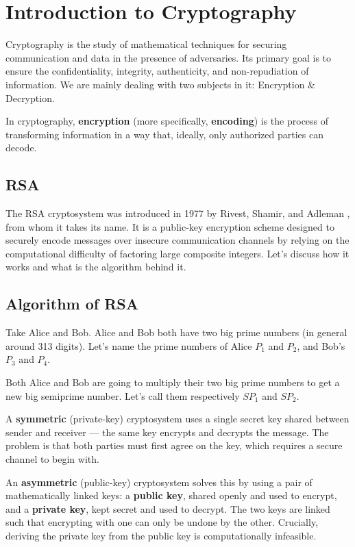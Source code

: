 \section{Introduction to Cryptography}

Cryptography is the study of mathematical techniques for securing communication
and data in the presence of adversaries. Its primary goal is to ensure the
confidentiality, integrity, authenticity, and non-repudiation of information.
We are mainly dealing with two subjects in it: Encryption \& Decryption.

\begin{smjdefinition}
In cryptography, \textbf{encryption} (more specifically, \textbf{encoding})
is the process of transforming information in a way that, ideally, only
authorized parties can decode.
\end{smjdefinition}

\subsection{RSA}

The RSA cryptosystem was introduced in 1977 by Rivest, Shamir, and Adleman
\cite{rsa1978}, from whom it takes its name. It is a public-key encryption
scheme designed to securely encode messages over insecure communication
channels by relying on the computational difficulty of factoring large
composite integers. Let's discuss how it works and what is the algorithm
behind it.

\subsection{Algorithm of RSA}

Take Alice and Bob. Alice and Bob both have two big prime numbers (in general
around 313 digits). Let's name the prime numbers of Alice $P_1$ and $P_2$,
and Bob's $P_3$ and $P_4$.

Both Alice and Bob are going to multiply their two big prime numbers to get a
new big semiprime number. Let's call them respectively $SP_1$ and $SP_2$.

\begin{smjdefinition}
A \textbf{symmetric} (private-key) cryptosystem uses a single secret key
shared between sender and receiver --- the same key encrypts and decrypts the
message. The problem is that both parties must first agree on the key, which
requires a secure channel to begin with.

An \textbf{asymmetric} (public-key) cryptosystem solves this by using a pair
of mathematically linked keys: a \textbf{public key}, shared openly and used
to encrypt, and a \textbf{private key}, kept secret and used to decrypt. The
two keys are linked such that encrypting with one can only be undone by the
other. Crucially, deriving the private key from the public key is
computationally infeasible.
\end{smjdefinition}

